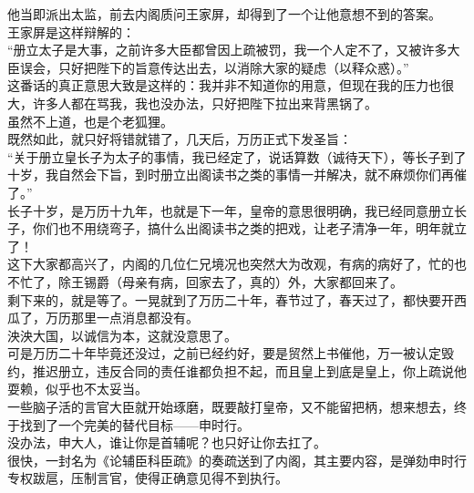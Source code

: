 \begin{multicols}{\theparacolNo}
他当即派出太监，前去内阁质问王家屏，却得到了一个让他意想不到的答案。\\

王家屏是这样辩解的：\\

“册立太子是大事，之前许多大臣都曾因上疏被罚，我一个人定不了，又被许多大臣误会，只好把陛下的旨意传达出去，以消除大家的疑虑（以释众惑）。”\\

这番话的真正意思大致是这样的：我并非不知道你的用意，但现在我的压力也很大，许多人都在骂我，我也没办法，只好把陛下拉出来背黑锅了。\\

虽然不上道，也是个老狐狸。\\

既然如此，就只好将错就错了，几天后，万历正式下发圣旨：\\

“关于册立皇长子为太子的事情，我已经定了，说话算数（诚待天下），等长子到了十岁，我自然会下旨，到时册立出阁读书之类的事情一并解决，就不麻烦你们再催了。”\\

长子十岁，是万历十九年，也就是下一年，皇帝的意思很明确，我已经同意册立长子，你们也不用绕弯子，搞什么出阁读书之类的把戏，让老子清净一年，明年就立了！\\

这下大家都高兴了，内阁的几位仁兄境况也突然大为改观，有病的病好了，忙的也不忙了，除王锡爵（母亲有病，回家去了，真的）外，大家都回来了。\\

剩下来的，就是等了。一晃就到了万历二十年，春节过了，春天过了，都快要开西瓜了，万历那里一点消息都没有。\\

泱泱大国，以诚信为本，这就没意思了。\\

可是万历二十年毕竟还没过，之前已经约好，要是贸然上书催他，万一被认定毁约，推迟册立，违反合同的责任谁都负担不起，而且皇上到底是皇上，你上疏说他耍赖，似乎也不太妥当。\\

一些脑子活的言官大臣就开始琢磨，既要敲打皇帝，又不能留把柄，想来想去，终于找到了一个完美的替代目标——申时行。\\

没办法，申大人，谁让你是首辅呢？也只好让你去扛了。\\

很快，一封名为《论辅臣科臣疏》的奏疏送到了内阁，其主要内容，是弹劾申时行专权跋扈，压制言官，使得正确意见得不到执行。\\


\end{multicols}
